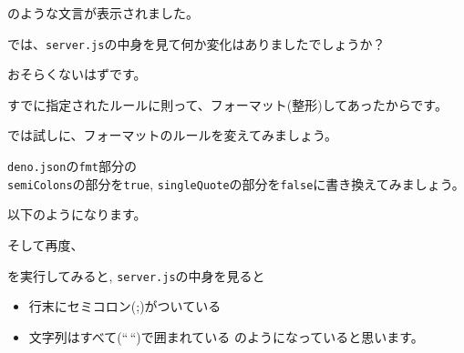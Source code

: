 のような文言が表示されました。

では、\texttt{server.js}の中身を見て何か変化はありましたでしょうか？

おそらくないはずです。

すでに指定されたルールに則って、フォーマット(整形)してあったからです。

では試しに、フォーマットのルールを変えてみましょう。

\texttt{deno.json}の\texttt{fmt}部分の\\
\texttt{semiColons}の部分を\texttt{true},
\texttt{singleQuote}の部分を\texttt{false}に書き換えてみましょう。

以下のようになります。

\begin{Shaded}
\begin{Highlighting}[]
   \FunctionTok{\{}
    \FunctionTok{:} \FunctionTok{,} \ErrorTok{//} 
    \FunctionTok{:} \FunctionTok{,} \ErrorTok{//} 
    \FunctionTok{:} \FunctionTok{,} \ErrorTok{//} 
    \FunctionTok{:} \FunctionTok{,} \ErrorTok{//} 
    \FunctionTok{:} \FunctionTok{,} \ErrorTok{//} 
    \FunctionTok{:} \FunctionTok{,}
    \FunctionTok{:} \OtherTok{[}\OtherTok{]}
  \FunctionTok{\}}\ErrorTok{,}
\end{Highlighting}
\end{Shaded}

そして再度、

\begin{Shaded}
\begin{Highlighting}[]
\end{Highlighting}
\end{Shaded}

を実行してみると, \texttt{server.js}の中身を見ると

\begin{itemize}
\item
  行末にセミコロン(;)がついている
\item
  文字列はすべて(``\,``)で囲まれている のようになっていると思います。
\end{itemize}

